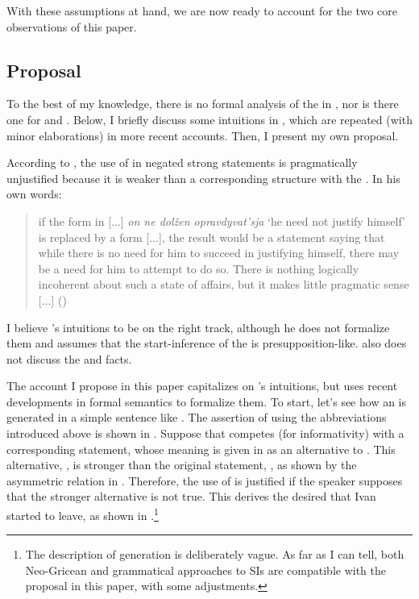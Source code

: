 \documentclass[output=paper,newtxmath,colorlinks,citecolor=brown]{langsci/langscibook}
\begin{document}
\noindent With these assumptions at hand, we are now ready to  account for the two core observations of this paper.

 \subsection{Proposal}\label{subsect:proposalnutshell}
 To the best of my knowledge, there is no formal analysis of the  in , nor is there one for  and . Below, I briefly discuss some intuitions in \cite{rap85}, which are repeated (with minor elaborations) in more recent accounts. Then, I present my own proposal.

According to \cite{rap85}, the use of  in negated strong  statements is pragmatically unjustified because it is weaker than a corresponding structure with the . In his own words:

	\begin{quote}
	if the   form in [...] \textit{on ne dolžen opravdyvat'sja} `he need not justify himself' is replaced by a  form [...], the result would be a statement saying that while there is no need for him to succeed in justifying himself, there may be a need for him to attempt to do so. There is nothing logically incoherent about such a state of affairs, but it makes little pragmatic sense [...]   \hfill (\citealt[218--219]{rap85})
	\end{quote}

\noindent I believe \citeauthor{rap85}'s intuitions to be on the right track, although he does not formalize them and assumes that the start-inference of the  is presup\-position-like. \cite{rap85} also does not discuss the  and  facts.

The account I propose in this paper capitalizes on \citeauthor{rap85}'s intuitions, but uses recent developments in formal semantics to formalize them. To start, let's see how an  is generated in a simple  sentence like . The assertion of  using the abbreviations introduced above is shown in   . Suppose that  competes (for informativity) with a corresponding  statement, whose meaning is given in  as an alternative to . This  alternative, , is stronger than the original  statement, , as shown by the asymmetric  relation in . Therefore, the use of  is justified if the speaker supposes that the stronger alternative is not true. This derives the desired  that Ivan started to leave, as shown in .\footnote{The description of  generation is deliberately vague. As far as I can tell, both Neo-Gricean and grammatical approaches to SIs are compatible with the proposal in this paper, with some adjustments.
}
\end{document}
